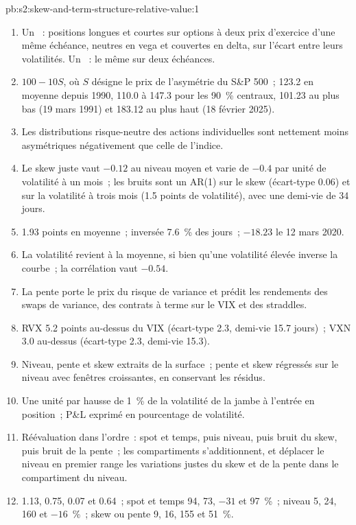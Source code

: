\begin{solution}{pb:s2:skew-and-term-structure-relative-value:1}
\begin{enumerate}
\item Un ~: positions longues et courtes sur options à deux prix d'exercice d'une même échéance, neutres en vega et couvertes en delta, sur l'écart entre leurs volatilités. Un
~: le même sur deux échéances.
\item $100 - 10S$, où $S$ désigne le prix de l'asymétrie du S\&P 500~; 123.2 en moyenne depuis 1990, 110.0 à 147.3 pour les 90~\% centraux, 101.23 au plus bas
(19 mars 1991) et 183.12 au plus haut (18 février 2025).
\item Les distributions risque-neutre des actions individuelles sont nettement moins asymétriques négativement que celle de l'indice.
\item Le skew juste vaut $-0.12$ au niveau moyen et varie de $-0.4$ par unité de volatilité à un mois~; les bruits sont un AR(1) sur le skew (écart-type 0.06) et sur
la volatilité à trois mois (1.5 points de volatilité), avec une demi-vie de 34 jours.
\item 1.93 points en moyenne~; inversée 7.6~\% des jours~; $-18.23$ le 12 mars 2020.
\item La volatilité revient à la moyenne, si bien qu'une volatilité élevée inverse la courbe~; la corrélation vaut $-0.54$.
\item La pente porte le prix du risque de variance et prédit les rendements des swaps de variance, des contrats à terme sur le VIX et des straddles.
\item RVX 5.2 points au-dessus du VIX (écart-type 2.3, demi-vie 15.7 jours)~; VXN 3.0 au-dessus (écart-type 2.3, demi-vie 15.3).
\item Niveau, pente et skew extraits de la surface~; pente et skew régressés sur le niveau avec fenêtres croissantes, en conservant les résidus.
\item Une unité par hausse de 1~\% de la volatilité de la jambe à l'entrée en position~; P\&L exprimé en pourcentage de volatilité.
\item Réévaluation dans l'ordre~: spot et temps, puis niveau, puis bruit du skew, puis bruit de la pente~; les compartiments s'additionnent, et déplacer le niveau en premier
range les variations justes du skew et de la pente dans le compartiment du niveau.
\item 1.13, 0.75, 0.07 et 0.64~; spot et temps 94, 73, $-31$ et 97~\%~; niveau 5, 24, 160 et $-16$~\%~; skew ou pente 9, 16, 155 et 51~\%.

\end{enumerate}
\end{solution}
